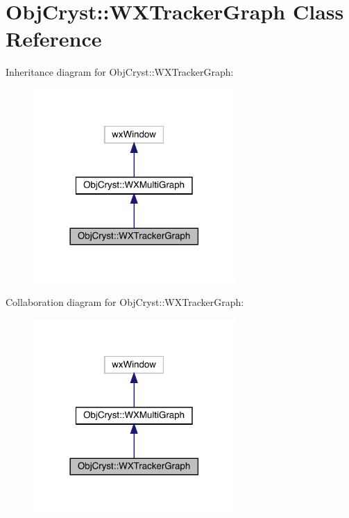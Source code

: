 \hypertarget{class_obj_cryst_1_1_w_x_tracker_graph}{}\section{Obj\+Cryst\+::W\+X\+Tracker\+Graph Class Reference}
\label{class_obj_cryst_1_1_w_x_tracker_graph}


Inheritance diagram for Obj\+Cryst\+::W\+X\+Tracker\+Graph\+:
\nopagebreak
\begin{figure}[H]
\begin{center}
\leavevmode
\includegraphics[width=218pt]{class_obj_cryst_1_1_w_x_tracker_graph__inherit__graph}
\end{center}
\end{figure}


Collaboration diagram for Obj\+Cryst\+::W\+X\+Tracker\+Graph\+:
\nopagebreak
\begin{figure}[H]
\begin{center}
\leavevmode
\includegraphics[width=218pt]{class_obj_cryst_1_1_w_x_tracker_graph__coll__graph}
\end{center}
\end{figure}
